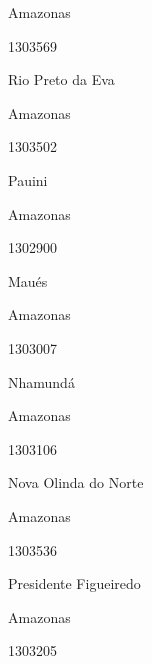 \documentclass[
  letterpaper,
]{report}
\begin{document}
\n    

\n      

Amazonas

\n      

1303569

\n      

Rio Preto da Eva

\n    

\n    

\n      

Amazonas

\n      

1303502

\n      

Pauini

\n    

\n    

\n      

Amazonas

\n      

1302900

\n      

Maués

\n    

\n    

\n      

Amazonas

\n      

1303007

\n      

Nhamundá

\n    

\n    

\n      

Amazonas

\n      

1303106

\n      

Nova Olinda do Norte

\n    

\n    

\n      

Amazonas

\n      

1303536

\n      

Presidente Figueiredo

\n    

\n    

\n      

Amazonas

\n      

1303205
\end{document}
